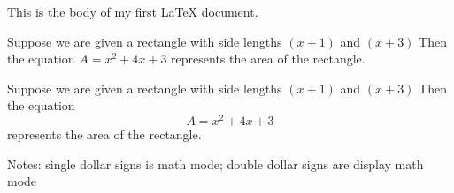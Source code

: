 \documentclass[11pt]{article}
\begin{document}
This is the body of my first LaTeX document.

Suppose we are given a rectangle with side lengths $(x+1)$ and $(x+3)$ Then the equation $A=x^2+4x+3$ represents the area of the rectangle.

Suppose we are given a rectangle with side lengths $(x+1)$ and $(x+3)$ Then the equation $$A=x^2+4x+3$$ represents the area of the rectangle.


Notes:
single dollar signs is math mode; double dollar signs are display math mode 
\end{document}

